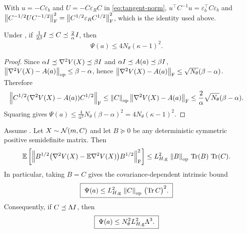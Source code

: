 \begin{remark}
\label{rem:setup-noise-id}
With $u=-C\varepsilon_b$ and $U=-C\varepsilon_RC$ in \eqref{eq:tangent-norm},
$u^\top C^{-1}u=\varepsilon_b^\top C\varepsilon_b$ and
$\left\lVert C^{-1/2}UC^{-1/2}\right\rVert_{\mathrm{F}}^2=\left\lVert C^{1/2}\varepsilon_RC^{1/2}\right\rVert_{\mathrm{F}}^2$, which is the
identity used above.
\end{remark}

\begin{lemma}
\label{lem:Psi-bound}
Under , if $\tfrac1{2\beta}I\preceq C\preceq\tfrac2\alpha I$, then
\[
    \boxed{\;
    \Psi(a)\leq 4N_\theta(\kappa-1)^2 .
    \;}
\]
\end{lemma}

\begin{proof}
Since $\alpha I\preceq\nabla^2V(X)\preceq\beta I$ and $\alpha I\preceq A(a)\preceq\beta I$,
$\left\lVert \nabla^2V(X)-A(a)\right\rVert_{\mathrm{op}}\leq\beta-\alpha$, hence
$\left\lVert \nabla^2V(X)-A(a)\right\rVert_{\mathrm{F}}\leq\sqrt{N_\theta}(\beta-\alpha)$. Therefore
\[
    \left\lVert C^{1/2}(\nabla^2V(X)-A(a))C^{1/2}\right\rVert_{\mathrm{F}}
    \leq
    \left\lVert C\right\rVert_{\mathrm{op}}\left\lVert \nabla^2V(X)-A(a)\right\rVert_{\mathrm{F}}
    \leq
    \frac2\alpha\sqrt{N_\theta}(\beta-\alpha).
\]
Squaring gives $\Psi(a)\leq\tfrac4{\alpha^2}N_\theta(\beta-\alpha)^2=4N_\theta(\kappa-1)^2$.
\end{proof}

\begin{lemma}
\label{lem:Psi-Hg}
Assume . Let $X\sim\mathcal{N}(m,C)$ and let $B\succeq0$ be any
deterministic symmetric positive semidefinite matrix. Then
\[
    \mathbb{E}\left[
        \left\lVert B^{1/2}\bigl(\nabla^2V(X)-\mathbb{E}\nabla^2V(X)\bigr)B^{1/2}\right\rVert_{\mathrm{F}}^2
    \right]
    \leq
    L_{H,\mathrm g}^2\,\left\lVert B\right\rVert_{\mathrm{op}}\,\operatorname{Tr}(B)\,\operatorname{Tr}(C).
\]
In particular, taking $B=C$ gives the covariance-dependent intrinsic bound
\begin{equation}
\label{eq:Psi-Hg}
    \boxed{\;
    \Psi(a)
    \leq
    L_{H,\mathrm g}^2\,\left\lVert C\right\rVert_{\mathrm{op}}\,\bigl(\operatorname{Tr} C\bigr)^2 .
    \;}
\end{equation}
Consequently, if $C\preceq\Lambda I$, then
\begin{equation}
\label{eq:Psi-Hg-Lambda}
    \boxed{\;
    \Psi(a)\leq N_\theta^2L_{H,\mathrm g}^2\Lambda^3 .
    \;}
\end{equation}
\end{lemma}

